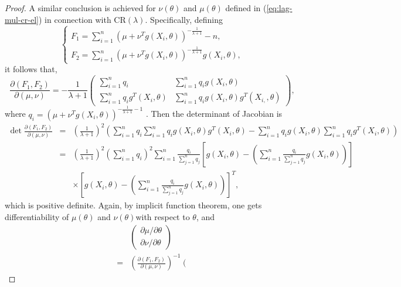 \begin{proof}
A similar conclusion is achieved for $\nu\left(\theta\right)$ and
$\mu\left(\theta\right)$ defined in (\ref{eq:lag-mul-cr-el}) in
connection with CR$\left(\lambda\right)$. Specifically, defining
\[
\begin{cases}
F_{1}=\sum_{i=1}^{n}\left(\mu+\nu^{T}g\left(X_{i},\theta\right)\right)^{-\frac{1}{\lambda+1}}-n,\\
F_{2}=\sum_{i=1}^{n}\left(\mu+\nu^{T}g\left(X_{i},\theta\right)\right)^{-\frac{1}{\lambda+1}}g\left(X_{i},\theta\right),
\end{cases}
\]
it follows that,
\[
\frac{\partial\left(F_{1},F_{2}\right)}{\partial\left(\mu,\nu\right)}=-\frac{1}{\lambda+1}\left(\begin{array}{cc}
\sum_{i=1}^{n}q_{i} & \sum_{i=1}^{n}q_{i}g\left(X_{i},\theta\right)\\
\sum_{i=1}^{n}q_{i}g^{T}\left(X_{i},\theta\right) & \sum_{i=1}^{n}q_{i}g\left(X_{i},\theta\right)g^{T}\left(X_{i,},\theta\right)
\end{array}\right),
\]
 where $q_{i}=\left(\mu+\nu^{T}g\left(X_{i},\theta\right)\right)^{-\frac{1}{\lambda+1}-1}$
. Then the determinant of Jacobian is 
\begin{eqnarray*}
\det\frac{\partial\left(F_{1},F_{2}\right)}{\partial\left(\mu,\nu\right)} & = & \left(\frac{1}{\lambda+1}\right)^{2}\left(\sum_{i=1}^{n}q_{i}\sum_{i=1}^{n}q_{i}g\left(X_{i},\theta\right)g^{T}\left(X_{i},\theta\right)-\sum_{i=1}^{n}q_{i}g\left(X_{i},\theta\right)\sum_{i=1}^{n}q_{i}g^{T}\left(X_{i},\theta\right)\right)\\
 & = & \left(\frac{1}{\lambda+1}\right)^{2}\left(\sum_{i=1}^{n}q_{i}\right)^{2}\sum_{i=1}^{n}\frac{q_{i}}{\sum_{j=1}^{n}q_{j}}\left[g\left(X_{i},\theta\right)-\left(\sum_{i=1}^{n}\frac{q_{i}}{\sum_{j=1}^{n}q_{j}}g\left(X_{i},\theta\right)\right)\right]\\
 &  & \times\left[g\left(X_{i},\theta\right)-\left(\sum_{i=1}^{n}\frac{q_{i}}{\sum_{j=1}^{n}q_{j}}g\left(X_{i},\theta\right)\right)\right]^{T},
\end{eqnarray*}
which is positive definite. Again, by implicit function theorem, one
gets differentiability of $\mu\left(\theta\right)$ and $\nu\left(\theta\right)$with
respect to $\theta$, and 
\begin{eqnarray}
 &  & \left(\begin{array}{c}
\partial\mu/\partial\theta\\
\partial\nu/\partial\theta
\end{array}\right)\nonumber \\
 & = & \left(\frac{\partial\left(F_{1},F_{2}\right)}{\partial\left(\mu,\nu\right)}\right)^{-1}\left(\begin{array}{c}

\end{array}
\end{eqnarray}
\end{proof}
